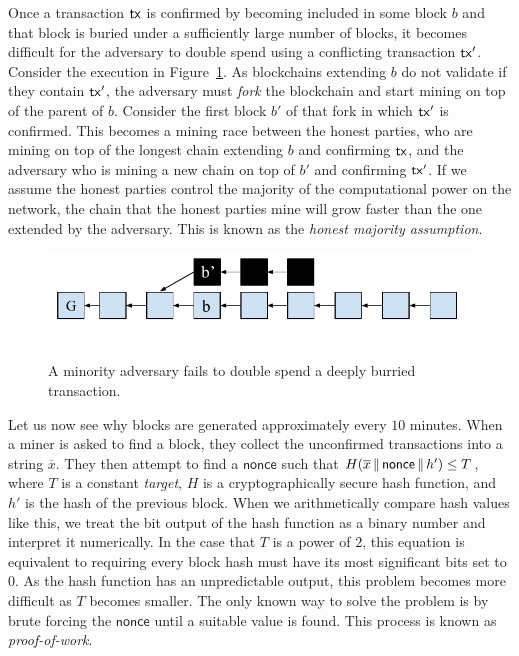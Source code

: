Once a transaction $\mathsf{tx}$ is confirmed by becoming included in some block $b$ and
that block is buried under a sufficiently large number of blocks, it
becomes difficult for the adversary to double spend using a conflicting
transaction $\mathsf{tx}'$. Consider the execution in Figure~\ref{fig.adversary-race}.
As blockchains extending $b$ do not validate if they
contain $\mathsf{tx}'$, the adversary must \emph{fork} the blockchain and start mining
on top of the parent of $b$. Consider the first block $b'$ of that fork in which
$\mathsf{tx}'$ is confirmed. This becomes a mining race between the honest parties, who
are mining on top of the longest chain extending $b$ and confirming $\mathsf{tx}$, and
the adversary who is mining a new chain on top of $b'$ and confirming $\mathsf{tx}'$. If
we assume the honest parties control the majority of the computational power on
the network, the chain that the honest parties mine will grow faster than the
one extended by the adversary. This is known as the \emph{honest majority
assumption}.

\begin{figure}[h]
    \caption{
    A minority adversary fails to double spend a deeply burried transaction.
    }
    \centering
    \includegraphics[width=0.7\columnwidth,keepaspectratio]{chapters/introduction/figures/adversary-race.pdf}
    \label{fig.adversary-race}
\end{figure}

Let us now see why blocks are generated approximately every $10$ minutes.
When a miner is asked to find a block, they collect the unconfirmed transactions
into a string $\overline{x}$. They then attempt to find a $\textsf{nonce}$ such
that $H(\overline{x} \,\|\, \textsf{nonce} \,\|\, h') \leq T$, where $T$ is a constant
\emph{target}, $H$ is a cryptographically secure hash function, and $h'$ is the
hash of the previous block. When we arithmetically compare hash values like this,
we treat the bit output of the hash function as a binary number and interpret it
numerically. In the case that $T$ is a power of $2$, this equation is
equivalent to requiring every block hash must have its most significant bits set
to $0$. As the hash function has an unpredictable output, this problem becomes
more difficult as $T$ becomes smaller. The only known way to solve the problem
is by brute forcing the $\textsf{nonce}$ until a suitable value is found. This
process is known as \emph{proof-of-work}.

